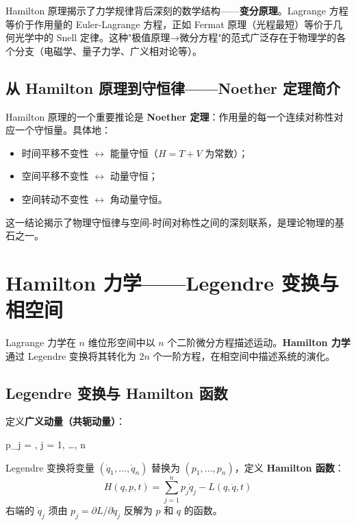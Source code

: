 \begin{remark}
	Hamilton 原理揭示了力学规律背后深刻的数学结构——\textbf{变分原理}。Lagrange 方程等价于作用量的 Euler-Lagrange 方程，正如 Fermat 原理（光程最短）等价于几何光学中的 Snell 定律。这种"极值原理→微分方程"的范式广泛存在于物理学的各个分支（电磁学、量子力学、广义相对论等）。
\end{remark}

\subsection{从 Hamilton 原理到守恒律——Noether 定理简介}

Hamilton 原理的一个重要推论是 \textbf{Noether 定理}：作用量的每一个连续对称性对应一个守恒量。具体地：
\begin{itemize}
	\item 时间平移不变性 $\longleftrightarrow$ 能量守恒（$H = T + V$ 为常数）；
	\item 空间平移不变性 $\longleftrightarrow$ 动量守恒；
	\item 空间转动不变性 $\longleftrightarrow$ 角动量守恒。
\end{itemize}

这一结论揭示了物理守恒律与空间-时间对称性之间的深刻联系，是理论物理的基石之一。

\section{Hamilton 力学——Legendre 变换与相空间}

Lagrange 力学在 $n$ 维位形空间中以 $n$ 个二阶微分方程描述运动。\textbf{Hamilton 力学}通过 Legendre 变换将其转化为 $2n$ 个一阶方程，在相空间中描述系统的演化。

\subsection{Legendre 变换与 Hamilton 函数}

定义\textbf{广义动量（共轭动量）}：
\begin{myformula}
	p_j = , \quad j = 1, \ldots, n
\end{myformula}

Legendre 变换将变量 $(\dot{q}_1, \ldots, \dot{q}_n)$ 替换为 $(p_1, \ldots, p_n)$，定义 \textbf{Hamilton 函数}：
\[
H(q, p, t) = \sum_{j=1}^{n} p_j \dot{q}_j - L(q, \dot{q}, t)
\]
右端的 $\dot{q}_j$ 须由 $p_j = \partial L / \partial \dot{q}_j$ 反解为 $p$ 和 $q$ 的函数。

